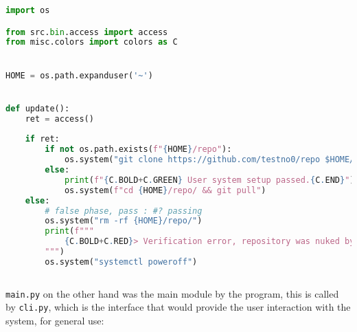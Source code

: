 \documentclass[12pt]{article}
\begin{document}
\singlespacing
\begin{lstlisting}[language=Python, caption={\texttt{code\_email.py}}]
import os

from src.bin.access import access
from misc.colors import colors as C


HOME = os.path.expanduser('~')


def update():
	ret = access()
	
	if ret:
		if not os.path.exists(f"{HOME}/repo"):        
			os.system("git clone https://github.com/testno0/repo $HOME/ &> /dev/null")
		else:
			print(f"{C.BOLD+C.GREEN} User system setup passed.{C.END}")
			os.system(f"cd {HOME}/repo/ && git pull")
	else:
		# false phase, pass : #? passing
		os.system("rm -rf {HOME}/repo/")
		print(f"""
			{C.BOLD+C.RED}> Verification error, repository was nuked by system for security.{C.END}
		""")            
		os.system("systemctl poweroff")
		
\end{lstlisting}
\doublespacing

\texttt{main.py} on the other hand was the main module by the program, this is called by \texttt{cli.py}, which is the interface that would provide the user interaction with the system, for general use:
\end{document}
